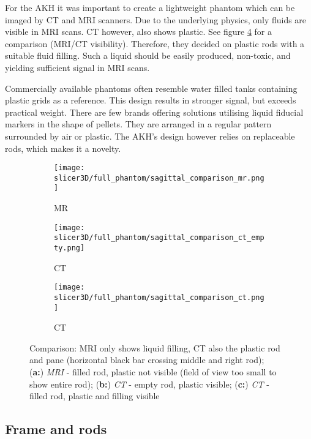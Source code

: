 For the AKH it was important to create a lightweight phantom which can be imaged by CT and MRI scanners.
Due to the underlying physics, only fluids are visible in MRI scans. CT however, also shows plastic.
See figure \ref{fig:sagittal_comparison} for a comparison (MRI/CT visibility).
Therefore, they decided on plastic rods with a suitable fluid filling.
Such a liquid should be easily produced, non-toxic, and yielding sufficient signal in MRI scans.

Commercially available phantoms often resemble water filled tanks containing plastic grids as a reference.
This design results in stronger signal, but exceeds practical weight.
There are few brands offering solutions utilising liquid fiducial markers in the shape of pellets.
They are arranged in a regular pattern surrounded by air or plastic.
The AKH's design however relies on replaceable rods, which makes it a novelty.


\begin{figure}[!htb]
\centering
  \begin{subfigure}[b]{0.1\textwidth}
    \texttt{[image: slicer3D/full\_phantom/sagittal\_comparison\_mr.png]}
    \caption{MR}
    \label{fig:sagittal_comparison_mr}
  \end{subfigure}
  \begin{subfigure}[b]{0.1\textwidth}
    \texttt{[image: slicer3D/full\_phantom/sagittal\_comparison\_ct\_empty.png]}
    \caption{CT}
    \label{fig:sagittal_comparison_ct_empty}
  \end{subfigure}
  \begin{subfigure}[b]{0.1\textwidth}
    \texttt{[image: slicer3D/full\_phantom/sagittal\_comparison\_ct.png]}
    \caption{CT}
    \label{fig:sagittal_comparison_ct}
  \end{subfigure}
  \caption{Comparison: MRI only shows liquid filling, CT also the plastic rod and pane (horizontal black bar crossing middle and right rod);\\ (\textbf{a:}) \textit{MRI} - filled rod, plastic not visible (field of view too small to show entire rod); (\textbf{b:}) \textit{CT} - empty rod, plastic visible; (\textbf{c:}) \textit{CT} - filled rod, plastic and filling visible}
  \label{fig:sagittal_comparison}
\end{figure}

\subsection{Frame and rods}

